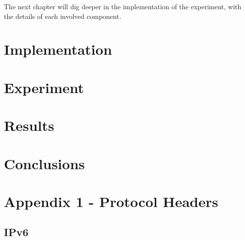 \documentclass[12pt]{article}
\begin{document}
The next chapter will dig deeper in the implementation of the experiment, with the details of each involved component.




\pagebreak

\section{Implementation}
\label{sec:4}

\pagebreak

\section{Experiment}
\label{sec:5}

\pagebreak

\section{Results}
\label{sec:6}

\pagebreak

\section{Conclusions}
\label{sec:7}

\pagebreak








\pagebreak


\appendix

\section{Appendix 1 - Protocol Headers}
\label{Appendix 1}

\subsection*{IPv6}
\end{document}
